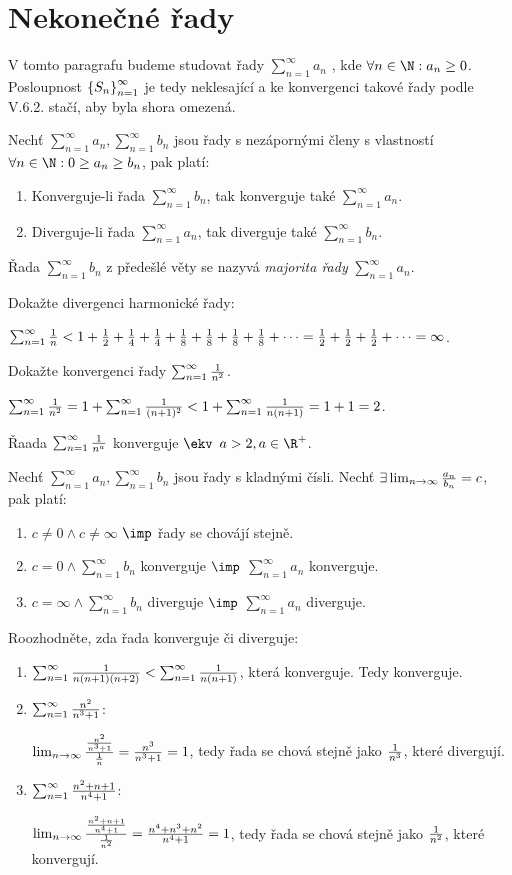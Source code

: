 
\BeginDoc{}
\def\posloup{$\zs{a_n}_{n=1}^{\infty}$}
\def\pos#1{\zs{#1}_{n=1}^{\infty}}
\def\li{\lim_{n\rightarrow\infty}}
\def\sup{{\rm sup\ }}
\def\sciwinfup{{\rm inf\ }}
\def\su{\sum_{n=1}^{\infty}}
\section{Nekonečné řady}
\Poz
V tomto paragrafu budeme studovat řady $\su a_n$
, kde $\forall n \in \N:a_n\ge0$. Posloupnost $\pos{S_n}$
je tedy neklesající a ke konvergenci takové řady podle V.6.2. stačí, aby byla 
shora omezená.

Nechť $\su a_n,\su b_n$ jsou řady s nezápornými členy s vlastností
$\forall n \in \N : 0\ge a_n \ge b_n$, pak platí:
\begin{enumerate}
	\item Konverguje-li řada $\su b_n$, tak konverguje také $\su a_n$.
	\item Diverguje-li řada $\su a_n$, tak diverguje také $\su b_n$.
\end{enumerate}
\Def Řada $\su b_n$ z předešlé věty se nazyvá \emph{majorita řady} $\su a_n$.

\Pr Dokažte divergenci harmonické řady:

$\su \f 1 n < 1 + \f 12 + \f 14+\f14+\f18+\f18+\f18+\f18+\cdots =
\f 12+\f12+\f12+\cdots = \infty$.

\Pr Dokažte konvergenci řady $\su \f 1 {n^2}$.


$\su \f 1{n^2} = 1+\su \f 1{(n+1)^2}   < 1+\su \f1{n(n+1)} = 1+1 = 2$.

\V Řaada $\su \f{1}{n^a}$ konverguje $\ekv$ $a>2,a\in\R^+$.

Nechť $\su a_n,\su b_n$ jsou řady s kladnými čísli.
Nechť $\exists \li \f{a_n}{b_n} = c$, pak platí:

\begin{enumerate}
	\item $c\neq 0 \land c\neq \infty$ $\imp$ řady se chovájí stejně.
	\item $c=0\land \su b_n$ konverguje $\imp$ $\su a_n$ konverguje.
	\item $c=\infty\land \su b_n$ diverguje $\imp$ $\su a_n$ diverguje.
\end{enumerate}

\Pr
Roozhodněte, zda řada konverguje či diverguje:
\begin{enumerate}
	\item $\su \f 1{n(n+1)(n+2)} < \su \f1{n(n+1)}$, která konverguje.
		Tedy konverguje.
	\item $\su \f{n^2}{n^3+1}$:

		$\li \f{\f{n^2}{n^3+1}}{\f 1 n} = \f{n^3}{n^3+1} = 1$,
		tedy řada se chová stejně jako $\frac 1{n^3}$, které divergují.
	\item $\su \f{n^2+n+1}{n^4+1}$:

		$\li \f{\f{n^2+n+1}{n^4+1}}{\f 1 {n^2}} = \f{n^4+n^3+n^2}{n^4+1} = 1$,
		tedy řada se chová stejně jako $\frac 1{n^2}$, které konvergují.
\end{enumerate}


